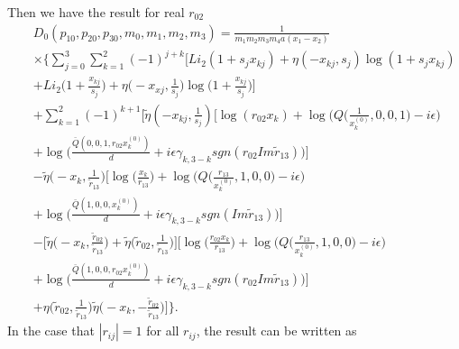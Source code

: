 Then we have the result for real $r_{02}$
\begin{eqnarray}
&&D_0(p_{10},p_{20},p_{30},m_0,m_1,m_2,m_3)=\frac{1}{m_1m_2m_3m_4a(x_1-x_2)}\nonumber\\
&&\times\biggl\{ \sum_{j=0}^{3}\sum_{k=1}^{2}(-1)^{j+k}\biggl[ Li_2(1+s_jx_{kj})+\eta(-x_{kj},s_j)\log(1+s_jx_{kj}) \nonumber\\
&&+Li_2\biggl(1+\frac{x_{kj}}{s_j}\biggr)+\eta\biggl(-x_{xj},\frac{1}{s_j}\biggr)\log\bigg(1+\frac{x_{kj}}{s_j}\bigg)\biggr]\nonumber\\
&&+\sum_{k=1}^{2}(-1)^{k+1}\biggl[\widetilde{\eta}(-x_{kj},\frac{1}{s_j}) \biggl[ \log(r_{02}x_k)+\log\biggl(Q\biggl(\frac{1}{x_k^{(0)}},0,0,1\biggr)-i\epsilon \biggr)\nonumber\\
&& +\log\biggl( \frac{\bar{Q}(0,0,1,r_{02}x_k^{(0)})}{d}+i\epsilon\gamma_{k,3-k}sgn(r_{02}Im\widetilde{r}_{13})\biggr) \biggr]\nonumber\\
&& -\widetilde{\eta}\biggl(-x_k,\frac{1}{\widetilde{r}_{13}}\biggr) \biggl[ \log\biggl(\frac{x_k}{r_{13}}\biggr)+\log\biggl( Q\biggl(\frac{r_{13}}{x_k^{(0)}},1,0,0\biggr)-i\epsilon \biggr)\nonumber\\
&&+\log\biggl( \frac{\bar{Q}(1,0,0,x_k^{(0)})}{d}+i\epsilon\gamma_{k,3-k}sgn(Im\widetilde{r}_{13})\biggr) \biggr]\nonumber\\
&&-\biggl[ \widetilde{\eta}\biggl(-x_k,\frac{\widetilde{r}_{02}}{\widetilde{r}_{13}} \biggr)+\widetilde{\eta}\biggl(\widetilde{r}_{02},\frac{1}{\widetilde{r}_{13}}\biggr) \biggr]\biggl[ \log\biggl(\frac{r_{02}x_k}{r_{13}}\biggr)+\log\biggl(Q\biggl(\frac{r_{13}}{x^{(0)}_k},1,0,0\biggr)-i\epsilon\biggr)\nonumber\\
&& +\log\biggl(\frac{\bar{Q}(1,0,0,r_{02}x_k^{(0)})}{d}+i\epsilon\gamma_{k,3-k}sgn(r_{02}Im\widetilde{r}_{13})\biggr)  \biggl]\nonumber\\
&&+\eta\biggl(\widetilde{r}_{02},\frac{1}{\widetilde{r}_{13}}\biggr)\widetilde{\eta}\bigg(-x_k,-\frac{\widetilde{r}_{02}}{\widetilde{r}_{13}}\bigg)
\biggr]\biggr\}.
\end{eqnarray}
In the case that $|r_{ij}|=1$ for all $r_{ij}$, the result can be written as
